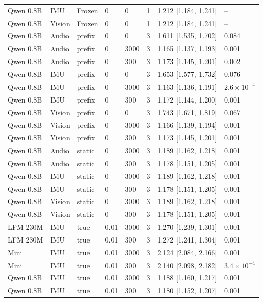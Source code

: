 {\begin{longtable}{@{}llllllll@{}}
Qwen 0.8B & IMU & Frozen & 0 & 0 & 1 & 1.212 [1.184, 1.241] & -- \\
Qwen 0.8B & Vision & Frozen & 0 & 0 & 1 & 1.212 [1.184, 1.241] & -- \\
Qwen 0.8B & Audio & prefix & 0 & 0 & 3 & 1.611 [1.535, 1.702] & 0.084 \\
Qwen 0.8B & Audio & prefix & 0 & 3000 & 3 & 1.165 [1.137, 1.193] & 0.001 \\
Qwen 0.8B & Audio & prefix & 0 & 300 & 3 & 1.173 [1.145, 1.201] & 0.002 \\
Qwen 0.8B & IMU & prefix & 0 & 0 & 3 & 1.653 [1.577, 1.732] & 0.076 \\
Qwen 0.8B & IMU & prefix & 0 & 3000 & 3 & 1.163 [1.136, 1.191] & $2.6\times10^{-4}$ \\
Qwen 0.8B & IMU & prefix & 0 & 300 & 3 & 1.172 [1.144, 1.200] & 0.001 \\
Qwen 0.8B & Vision & prefix & 0 & 0 & 3 & 1.743 [1.671, 1.819] & 0.067 \\
Qwen 0.8B & Vision & prefix & 0 & 3000 & 3 & 1.166 [1.139, 1.194] & 0.001 \\
Qwen 0.8B & Vision & prefix & 0 & 300 & 3 & 1.173 [1.145, 1.201] & 0.001 \\
Qwen 0.8B & Audio & static & 0 & 3000 & 3 & 1.189 [1.162, 1.218] & 0.001 \\
Qwen 0.8B & Audio & static & 0 & 300 & 3 & 1.178 [1.151, 1.205] & 0.001 \\
Qwen 0.8B & IMU & static & 0 & 3000 & 3 & 1.189 [1.162, 1.218] & 0.001 \\
Qwen 0.8B & IMU & static & 0 & 300 & 3 & 1.178 [1.151, 1.205] & 0.001 \\
Qwen 0.8B & Vision & static & 0 & 3000 & 3 & 1.189 [1.162, 1.218] & 0.001 \\
Qwen 0.8B & Vision & static & 0 & 300 & 3 & 1.178 [1.151, 1.205] & 0.001 \\
LFM 230M & IMU & true & 0.01 & 3000 & 3 & 1.270 [1.239, 1.301] & 0.001 \\
LFM 230M & IMU & true & 0.01 & 300 & 3 & 1.272 [1.241, 1.304] & 0.001 \\
Mini & IMU & true & 0.01 & 3000 & 3 & 2.124 [2.084, 2.166] & 0.001 \\
Mini & IMU & true & 0.01 & 300 & 3 & 2.140 [2.098, 2.182] & $3.4\times10^{-4}$ \\
Qwen 0.8B & IMU & true & 0.01 & 3000 & 3 & 1.188 [1.160, 1.217] & 0.001 \\
Qwen 0.8B & IMU & true & 0.01 & 300 & 3 & 1.180 [1.152, 1.207] & 0.001 \\

\end{longtable}}
